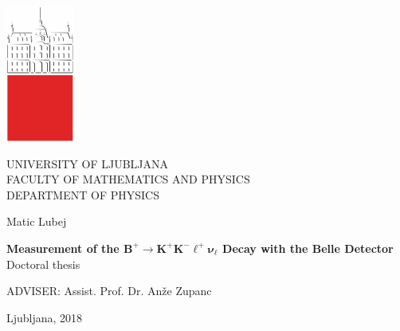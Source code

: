 \pagestyle{empty}
\begin{center}

\includegraphics{fig/logo2}

{\large UNIVERSITY OF LJUBLJANA\\
FACULTY OF MATHEMATICS AND PHYSICS\\
DEPARTMENT OF PHYSICS\\}

\vspace{5cm}

{\Large Matic Lubej\\}

\vspace{10mm}

{\bf \Large Measurement of the $\bm{B^+ \to K^+K^-\ell^+\nu_\ell}$ Decay with the Belle Detector\\}
\vspace{5mm}
{\large Doctoral thesis}\\

\vfill

{\large ADVISER: Assist. Prof. Dr. An\v ze Zupanc\\
}

\vspace{2cm}
{\large Ljubljana, 2018}

\end{center}



